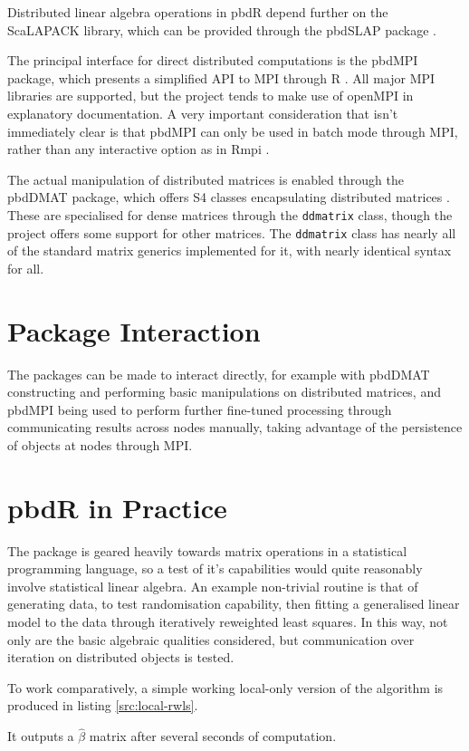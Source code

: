 \documentclass[a4paper,10pt]{article}
\begin{document}
Distributed linear algebra operations in pbdR depend further on the ScaLAPACK
library, which can be provided through the pbdSLAP package \cite{Chen2012pbdSLAPpackage}.

The principal interface for direct distributed computations is the pbdMPI
package, which presents a simplified API to MPI through R
\cite{Chen2012pbdMPIpackage}.  All major MPI libraries are supported, but the
project tends to make use of openMPI in explanatory documentation. A very
important consideration that isn't immediately clear  is that pbdMPI can only
be used in batch mode through MPI, rather than any interactive option as in
Rmpi \cite{yu02:_rmpi}.

The actual manipulation of distributed matrices is enabled through the pbdDMAT
package, which offers S4 classes encapsulating distributed matrices
\cite{pbdDMATpackage}. These are specialised for dense matrices through the
\texttt{ddmatrix} class, though the project offers some support for other
matrices. The \texttt{ddmatrix} class has nearly all of the standard matrix
generics implemented for it, with nearly identical syntax for all.

\section{Package Interaction}

The packages can be made to interact directly, for example with pbdDMAT
constructing and performing basic manipulations on distributed matrices, and
pbdMPI being used to perform further fine-tuned processing through
communicating results across nodes manually, taking advantage of the
persistence of objects at nodes through MPI.

\section{pbdR in Practice}

The package is geared heavily towards matrix operations in a statistical
programming language, so a test of it's capabilities would quite reasonably
involve statistical linear algebra. An example non-trivial routine is that of
generating data, to test randomisation capability, then fitting a generalised
linear model to the data through iteratively reweighted least squares. In this
way, not only are the basic algebraic qualities considered, but communication
over iteration on distributed objects is tested.

To work comparatively, a simple working local-only version of the algorithm is
produced in listing \ref{src:local-rwls}.

It outputs a \(\hat{\beta}\) matrix after several seconds of computation.
\end{document}
